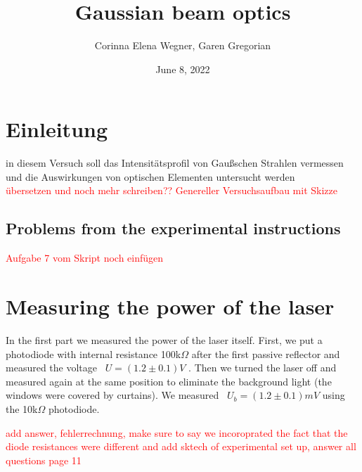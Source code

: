 \documentclass{article}
\begin{document}
 

\begin{titlepage}
\title{Gaussian beam optics}
\author{Corinna Elena Wegner, Garen Gregorian}
\date{June 8, 2022}
\maketitle %
\end{titlepage}

\newpage
\tableofcontents
\newpage

\section{Einleitung} 

in diesem Versuch soll das Intensitätsprofil von Gaußschen Strahlen vermessen und die Auswirkungen von optischen Elementen untersucht werden\\
\textcolor{red}{übersetzen und noch mehr schreiben??}
\textcolor{red}{Genereller Versuchsaufbau mit Skizze}

\subsection{Problems from the experimental instructions}

\textcolor{red}{Aufgabe 7 vom Skript noch einfügen}

\section{Measuring the power of the laser}

In the first part we measured the power of the laser itself. First, we put a photodiode with internal resistance 100k$\Omega$
after the first passive reflector and measured the voltage
\ $U=(1.2 \pm 0.1) V$ %
. Then we turned the laser off and measured again at the same position to eliminate the background light (the windows were covered by curtains). We measured 
\ $U_b = (1.2 \pm 0.1)mV$ 
using the 
10k$\Omega$
photodiode. 

\textcolor{red}{add answer, fehlerrechnung, make sure to say we incoroprated the fact that the diode resistances were different and add sktech of experimental set up, answer all questions page 11}
\end{document}
